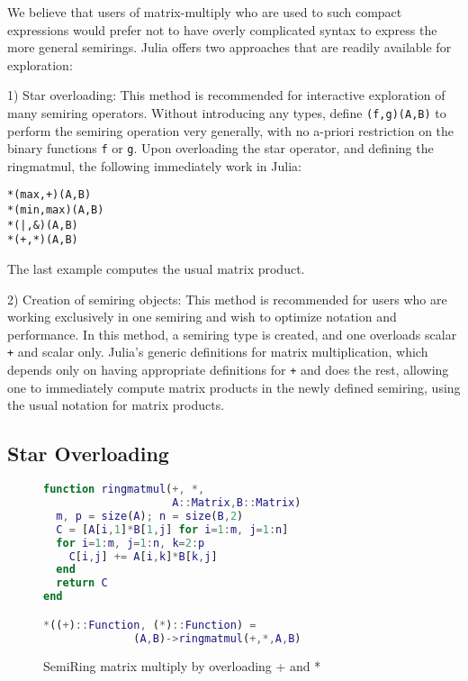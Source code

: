 \documentclass[conference]{IEEEtran}
\begin{document}
We believe that users of matrix-multiply who are used
to such compact expressions would prefer not to have
overly complicated syntax to express the more general
semirings.  Julia offers two approaches that are readily
available for exploration:

1) Star overloading:
This method is recommended for interactive exploration of many semiring operators.
Without introducing any types, define  {\tt *(f,g)(A,B)} to
perform the semiring operation very generally, with no a-priori restriction
on the binary functions {\tt f} or {\tt g}.   Upon overloading the star operator,
and defining the ringmatmul, the following immediately work in Julia:
\begin{verbatim}
*(max,+)(A,B)
*(min,max)(A,B)
*(|,&)(A,B)
*(+,*)(A,B)
\end{verbatim}
The last example computes the usual matrix product.

2) Creation of semiring objects:
This method is recommended for users who are working exclusively in one semiring and wish to optimize notation and performance.
In this method, a semiring type is created, and one overloads scalar {\tt +} and scalar {\tt *} only.
Julia's generic definitions for matrix multiplication, which depends only on having appropriate definitions for {\tt +} and {\tt *} does the rest, allowing one to immediately compute matrix products in the newly defined semiring, using the usual notation for matrix products.

\subsection{Star Overloading}

\begin{figure}
\begin{lstlisting}[language=matlab, frame=single]
function ringmatmul(+, *, 
                    A::Matrix,B::Matrix)
  m, p = size(A); n = size(B,2)
  C = [A[i,1]*B[1,j] for i=1:m, j=1:n]
  for i=1:m, j=1:n, k=2:p
    C[i,j] += A[i,k]*B[k,j]
  end
  return C
end

*((+)::Function, (*)::Function) = 
              (A,B)->ringmatmul(+,*,A,B)
\end{lstlisting}
\label{fig:ringmm}
\caption{SemiRing matrix multiply by overloading + and *}
\end{figure}
\end{document}
